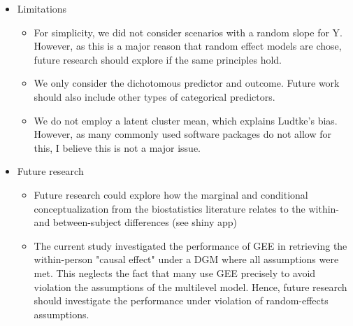 \documentclass[stu]{apa7}
\begin{document}
\begin{itemize}
    \item Limitations
    \begin{itemize}
        \item For simplicity, we did not consider scenarios with a random slope for Y. However, as this is a major reason that random effect models are chose, future research should explore if the same principles hold.
        \item We only consider the dichotomous predictor and outcome. Future work should also include other types of categorical predictors.
        \item We do not employ a latent cluster mean, which explains Ludtke's bias. However, as many commonly used software packages do not allow for this, I believe this is not a major issue.
    \end{itemize}
\item Future research
\begin{itemize}
    \item Future research could explore how the marginal and conditional conceptualization from the biostatistics literature relates to the within- and between-subject differences (see shiny app)
    \item The current study investigated the performance of GEE in retrieving the within-person "causal effect" under a DGM where all assumptions were met. This neglects the fact that many use GEE precisely to avoid violation the assumptions of the multilevel model. Hence, future research should investigate the performance under violation of random-effects assumptions. 
\end{itemize}
\end{itemize}

\printbibliography

% 
% 
% 
% 



\end{document}
